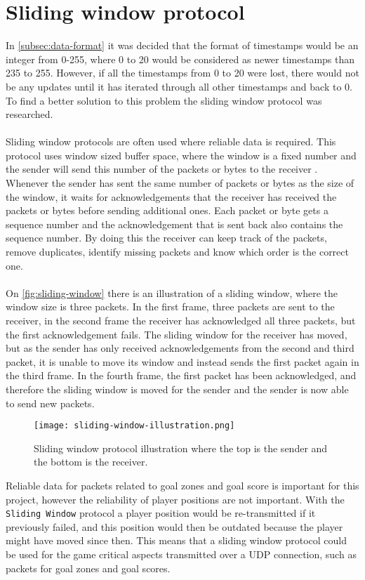 \section{Sliding window protocol}\label{sec:sliding-window}
In \autoref{subsec:data-format} it was decided that the format of timestamps would be an integer from 0-255, where 0 to 20 would be considered as newer timestamps than 235 to 255.
However, if all the timestamps from 0 to 20 were lost, there would not be any updates until it has iterated through all other timestamps and back to 0.
To find a better solution to this problem the sliding window protocol was researched.
\\\\
Sliding window protocols are often used where reliable data is required.
This protocol uses window sized buffer space, where the window is a fixed number and the sender will send this number of the packets or bytes to the receiver \cite{design-and-validation-of-computer-protocols}.
Whenever the sender has sent the same number of packets or bytes as the size of the window, it waits for acknowledgements that the receiver has received the packets or bytes before sending additional ones.
Each packet or byte gets a sequence number and the acknowledgement that is sent back also contains the sequence number.
By doing this the receiver can keep track of the packets, remove duplicates, identify missing packets and know which order is the correct one.
\\\\
On \autoref{fig:sliding-window} there is an illustration of a sliding window, where the window size is three packets.
In the first frame, three packets are sent to the receiver, in the second frame the receiver has acknowledged all three packets, but the first acknowledgement fails.
The sliding window for the receiver has moved, but as the sender has only received acknowledgements from the second and third packet, it is unable to move its window and instead sends the first packet again in the third frame.
In the fourth frame, the first packet has been acknowledged, and therefore the sliding window is moved for the sender and the sender is now able to send new packets.
\begin{figure}[H]
    \centering
    \texttt{[image: sliding-window-illustration.png]}
    \caption{Sliding window protocol illustration where the top is the sender and the bottom is the receiver.}
    \label{fig:sliding-window}
\end{figure}
\noindent
Reliable data for packets related to goal zones and goal score is important for this project, however the reliability of player positions are not important.
With the \texttt{Sliding Window} protocol a player position would be re-transmitted if it previously failed, and this position would then be outdated because the player might have moved since then.
This means that a sliding window protocol could be used for the game critical aspects transmitted over a UDP connection, such as packets for goal zones and goal scores.
